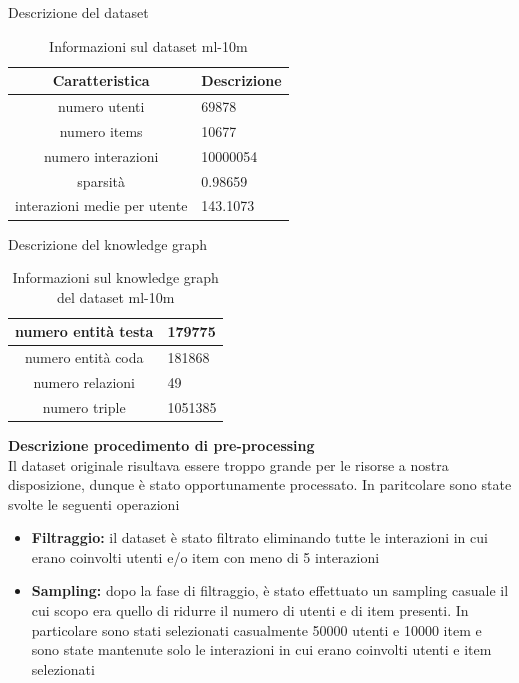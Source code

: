 \noindent Descrizione del dataset
\begin{table}[H]
    \centering
    \footnotesize
    \begin{tabularx}{\textwidth}{|c|X|}
        \hline
        \textbf{Caratteristica} & \textbf{Descrizione} \\
        \hline
        numero utenti & 69878 \\
        \hline
        numero items & 10677 \\
        \hline
        numero interazioni & 10000054 \\
        \hline
        sparsità & 0.98659 \\
        \hline
        interazioni medie per utente & 143.1073 \\
        \hline
    \end{tabularx}
    \caption{Informazioni sul dataset ml-10m}
    \label{tab:dataset_info}
\end{table}


\noindent Descrizione del knowledge graph
\begin{table}[H]
    \centering
    \footnotesize
    \begin{tabularx}{\textwidth}{|c|X|}
        \hline
        numero entità testa & 179775 \\
        \hline
        numero entità coda & 181868 \\
        \hline
        numero relazioni & 49 \\
        \hline
        numero triple & 1051385 \\
        \hline
    \end{tabularx}
    \caption{Informazioni sul knowledge graph del dataset ml-10m}
    \label{tab:dataset_info}
\end{table}




\noindent\textbf{Descrizione procedimento di pre-processing}\\


\noindent Il dataset originale risultava essere troppo grande per le risorse a nostra disposizione, dunque è stato opportunamente processato. In paritcolare sono state svolte le seguenti operazioni
\begin{itemize}
    \item \textbf{Filtraggio:} il dataset è stato filtrato eliminando tutte le interazioni in cui erano coinvolti utenti e/o item con meno di 5 interazioni
    \item \textbf{Sampling:} dopo la fase di filtraggio, è stato effettuato un sampling casuale il cui scopo era quello di ridurre il numero di utenti e di item presenti. In particolare sono stati selezionati casualmente 50000 utenti e 10000 item e sono state mantenute solo le interazioni in cui erano coinvolti utenti e item selezionati
\end{itemize}

